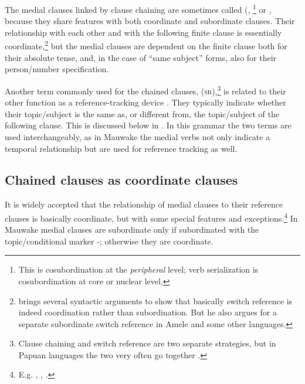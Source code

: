 The medial clauses linked by clause chaining are sometimes called  (\citealt{Olson1981}, \citealt[257]{FoleyEtAl1984} \footnote{This is cosubordination at the \textit{peripheral} level; verb serialization is cosubordination at core or nuclear level.} or  \citep[177]{Foley1986}, because they share features with both coordinate and subordinate clauses. Their relationship with each other and with the following finite clause is essentially coordinate,\footnote{\citet{Roberts1988a} brings several syntactic arguments to show that basically switch reference is indeed coordination rather than subordination. But he also argues for a separate subordinate switch reference in Amele and some other languages.} but the medial clauses are dependent on the finite clause both for their absolute tense, and, in the case of ``same subject'' forms, also for their person/number specification. 

Another term commonly used for the chained clauses,  (\textsc{sr}),\footnote{Clause chaining and switch reference are two separate strategies, but in Papuan languages the two very often  go together \citep[104]{Roberts1997}.} is related to their other function as a reference-tracking device \citep[ix]{HaimanEtAl1983}. They typically indicate whether their topic/subject is the same as, or different from, the topic/subject of the following clause. This is discussed below in . In this grammar the two terms are used interchangeably, as in Mauwake the medial verbs not only indicate a temporal relationship but are used for reference tracking as well.

\subsection{Chained clauses as coordinate clauses}

It is widely accepted that the relationship of medial clauses to their reference clauses is basically coordinate, but with some special features and exceptions.\footnote{E.g. \citet[175,193]{Reesink1987}, \citet[51]{Roberts1988a}, \citet[13]{Roberts1994}.} In Mauwake medial clauses are subordinate only if subordinated with the topic/conditional marker -; otherwise they are coordinate. 

